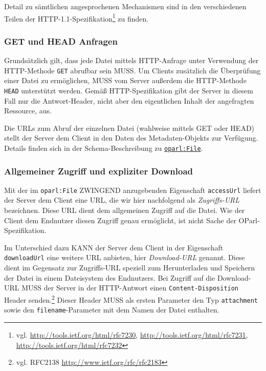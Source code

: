 \documentclass[,a4paper]{article}
\begin{document}
Detail zu sämtlichen angesprochenen Mechanismen sind in den
verschiedenen Teilen der HTTP-1.1-Spezifikation\footnote{vgl.
  \url{http://tools.ietf.org/html/rfc7230},
  \url{http://tools.ietf.org/html/rfc7231},
  \url{http://tools.ietf.org/html/rfc7232}} zu finden.

\subsubsection{GET und HEAD Anfragen}\label{get-und-head-anfragen}

Grundsätzlich gilt, dass jede Datei mittels HTTP-Anfrage unter
Verwendung der HTTP-Methode \texttt{GET} abrufbar sein MUSS. Um Clients
zusätzlich die Überprüfung einer Datei zu ermöglichen, MUSS vom Server
außerdem die HTTP-Methode \texttt{HEAD} unterstützt werden. Gemäß
HTTP-Spezifikation gibt der Server in diesem Fall nur die
Antwort-Header, nicht aber den eigentlichen Inhalt der angefragten
Ressource, aus.

Die URLs zum Abruf der einzelnen Datei (wahlweise mittels GET oder HEAD)
stellt der Server dem Client in den Daten des Metadaten-Objekts zur
Verfügung. Details finden sich in der Schema-Beschreibung zu
\hyperref[oparlux5fdocument]{\texttt{oparl:File}}.

\subsubsection{Allgemeiner Zugriff und expliziter
Download}\label{allgemeiner-zugriff-und-expliziter-download}

Mit der im \texttt{oparl:File} ZWINGEND anzugebenden Eigenschaft
\texttt{accessUrl} liefert der Server dem Client eine URL, die wir hier
nachfolgend als \emph{Zugriffs-URL} bezeichnen. Diese URL dient dem
allgemeinen Zugriff auf die Datei. Wie der Client dem Endnutzer diesen
Zugriff genau ermöglicht, ist nicht Sache der OParl-Spezifikation.

Im Unterschied dazu KANN der Server dem Client in der Eigenschaft
\texttt{downloadUrl} eine weitere URL anbieten, hier \emph{Download-URL}
genannt. Diese dient im Gegensatz zur Zugriffs-URL speziell zum
Herunterladen und Speichern der Datei in einem Dateisystem des
Endnutzers. Bei Zugriff auf die Download-URL MUSS der Server in der
HTTP-Antwort einen \texttt{Content-Disposition} Header senden.\footnote{vgl.
  RFC2138 \url{http://www.ietf.org/rfc/rfc2183}} Dieser Header MUSS als
ersten Parameter den Typ \texttt{attachment} sowie den
\texttt{filename}-Parameter mit dem Namen der Datei enthalten.
\end{document}
